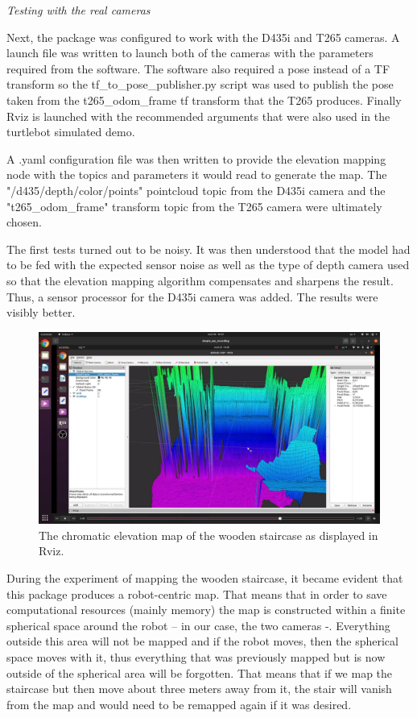 \documentclass{article}
\begin{document}
\bigskip
\clearpage

\textit{Testing with the real cameras}

\bigskip

Next, the package was configured to work with the D435i and T265 cameras. A launch file was written to launch both of the cameras with the parameters required from the software. The software also required a pose instead of a TF transform so the tf\_to\_pose\_publisher.py script was used to publish the pose taken from the t265\_odom\_frame tf transform that the T265 produces. Finally Rviz is launched with the recommended arguments that were also used in the turtlebot simulated demo.

A .yaml configuration file was then written to provide the elevation mapping node with the topics and parameters it would read to generate the map. The "/d435/depth/color/points" pointcloud topic from the D435i camera and the "t265\_odom\_frame" transform topic from the T265 camera were ultimately chosen.

The first tests turned out to be noisy. It was then understood that the model had to be fed with the expected sensor noise as well as the type of depth camera used so that the elevation mapping algorithm compensates and sharpens the result. Thus, a sensor processor for the D435i camera was added. The results were visibly better.

\begin{figure}[h] %
    \centering
	\includegraphics[width=\textwidth,height=\textheight,keepaspectratio]{report1-img017.png} %
	\caption{The chromatic elevation map of the wooden staircase as displayed in Rviz. }
\end{figure}

During the experiment of mapping the wooden staircase, it became evident that this package produces a robot-centric map. That means that in order to save computational resources (mainly memory) the map is constructed within a finite spherical space around the robot – in our case, the two cameras -. Everything outside this area will not be mapped and if the robot moves, then the spherical space moves with it, thus everything that was previously mapped but is now outside of the spherical area will be forgotten. That means that if we map the staircase but then move about three meters away from it, the stair will vanish from the map and would need to be remapped again if it was desired.
\end{document}
